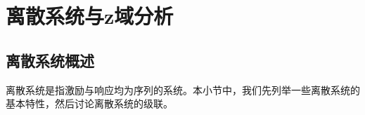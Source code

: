 \section{离散系统与z域分析}\label{sec:Discrete_System_z_Analysis}


\subsection{离散系统概述}\label{sub:discrete_system_overview}

离散系统是指激励与响应均为序列的系统。本小节中，我们先列举一些离散系统的基本特性，然后讨论离散系统的级联。

